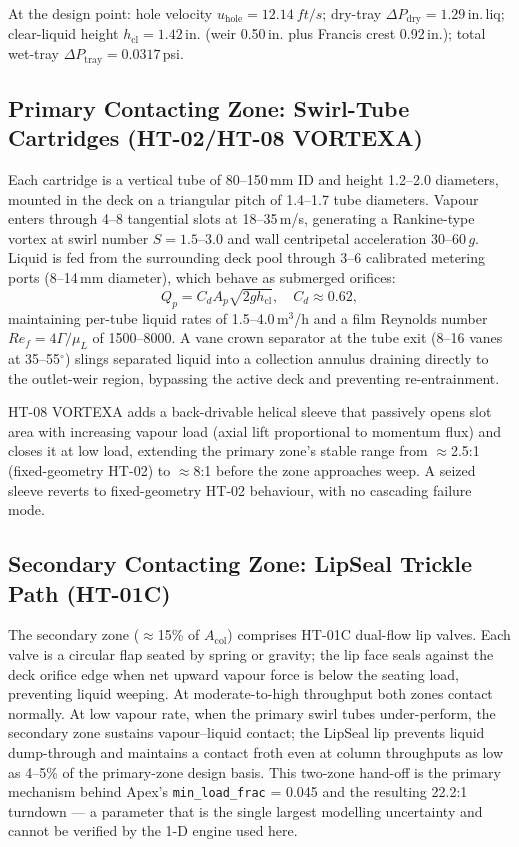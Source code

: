 \documentclass[11pt,letterpaper]{article}
\newcommand{\dpd}{\Delta P_{\mathrm{dry}}}
\newcommand{\dpt}{\Delta P_{\mathrm{tray}}}
\newcommand{\hcl}{h_{\mathrm{cl}}}
\begin{document}
At the design point: hole velocity $u_{\mathrm{hole}}=\SI{12.14}{ft/s}$;
dry-tray $\dpd=1.29$\,in.\,liq; clear-liquid height
$\hcl=1.42$\,in. (weir 0.50\,in. plus Francis crest 0.92\,in.);
total wet-tray $\dpt=0.0317$\,psi.

\subsection{Primary Contacting Zone: Swirl-Tube Cartridges (HT-02/HT-08 VORTEXA)}
\label{sec:primary}

Each cartridge is a vertical tube of 80--150\,mm ID and height 1.2--2.0
diameters, mounted in the deck on a triangular pitch of 1.4--1.7 tube
diameters.  Vapour enters through 4--8 tangential slots at 18--35\,m/s,
generating a Rankine-type vortex at swirl number $S=1.5$--3.0 and wall
centripetal acceleration 30--60\,$g$.  Liquid is fed from the surrounding
deck pool through 3--6 calibrated metering ports (8--14\,mm diameter), which
behave as submerged orifices:
\begin{equation}
  Q_p = C_d A_p \sqrt{2g h_{\mathrm{cl}}}, \quad C_d \approx 0.62,
  \label{eq:port_flow}
\end{equation}
maintaining per-tube liquid rates of 1.5--4.0\,m$^3$/h and a film Reynolds
number $Re_f = 4\Gamma/\mu_L$ of 1500--8000.  A vane crown separator at the
tube exit (8--16 vanes at 35--55\ensuremath{^\circ}) slings separated liquid
into a collection annulus draining directly to the outlet-weir region,
bypassing the active deck and preventing re-entrainment.

HT-08 VORTEXA adds a back-drivable helical sleeve that passively opens slot
area with increasing vapour load (axial lift proportional to momentum flux)
and closes it at low load, extending the primary zone's stable range from
$\approx$2.5:1 (fixed-geometry HT-02) to $\approx$8:1 before the zone
approaches weep.  A seized sleeve reverts to fixed-geometry HT-02 behaviour,
with no cascading failure mode.

\subsection{Secondary Contacting Zone: LipSeal Trickle Path (HT-01C)}
\label{sec:secondary}

The secondary zone ($\approx$15\% of $A_{\mathrm{col}}$) comprises HT-01C
dual-flow lip valves.  Each valve is a circular flap seated by spring or
gravity; the lip face seals against the deck orifice edge when net upward
vapour force is below the seating load, preventing liquid weeping.  At
moderate-to-high throughput both zones contact normally.  At low vapour rate,
when the primary swirl tubes under-perform, the secondary zone sustains
vapour--liquid contact; the LipSeal lip prevents liquid dump-through and
maintains a contact froth even at column throughputs as low as 4--5\% of
the primary-zone design basis.  This two-zone hand-off is the primary
mechanism behind Apex's \texttt{min\_load\_frac} = 0.045 and the resulting
22.2:1 turndown --- a parameter that is the single largest modelling
uncertainty and cannot be verified by the 1-D engine used here.
\end{document}
